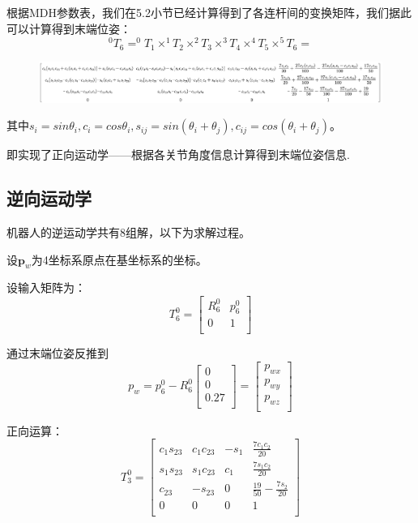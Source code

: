根据MDH参数表，我们在5.2小节已经计算得到了各连杆间的变换矩阵，我们据此可以计算得到末端位姿：
$$
    ^0T_6=^0T_1 \times ^1T_2 \times ^2T_3 \times ^3T_4 \times ^4T_5 \times ^5T_6=
$$
\begin{figure}[htbp]
    \centering
    \includegraphics[width=\textwidth]{Image/fig25.jpg}
\end{figure}

其中$s_i=sin\theta_i,c_i=cos\theta_i,s_{ij}=sin\left(\theta_i+\theta_j\right),c_{ij}=cos\left(\theta_i+\theta_j\right)$。

即实现了正向运动学——根据各关节角度信息计算得到末端位姿信息.

\subsection{逆向运动学}
机器人的逆运动学共有8组解，以下为求解过程。

设$\boldsymbol{p}_w$为4坐标系原点在基坐标系的坐标。

设输入矩阵为：
\begin{equation}
    T_{6}^{0}=\left[ \begin{matrix}	R_{6}^{0}&		p_{6}^{0}\\	0&		1\\\end{matrix} \right] 
\end{equation}

通过末端位姿反推到
\begin{equation}
    p_w=p_{6}^{0}-R_{6}^{0}\left[ \begin{array}{c}	0\\	0\\	0.27\\\end{array} \right] =\left[ \begin{array}{c}	p_{wx}\\	p_{wy}\\	p_{wz}\\\end{array} \right] 
\end{equation}

正向运算：
\begin{equation}
    T_{3}^{0}=\left[ \begin{matrix}	c_1s_{23}&		c_1c_{23}&		-s_1&		\frac{7c_1c_2}{20}\\	s_1s_{23}&		s_1c_{23}&		c_1&		\frac{7s_1c_2}{20}\\	c_{23}&		-s_{23}&		0&		\frac{19}{50}-\frac{7s_2}{20}\\	0&		0&		0&		1\\\end{matrix} \right]
\end{equation}

